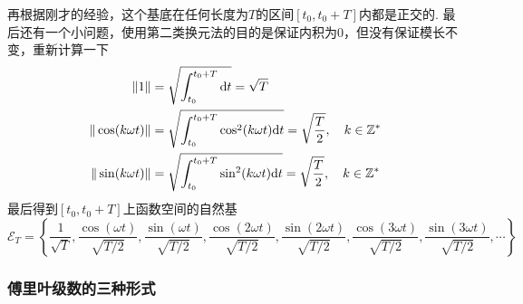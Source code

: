\documentclass[main.tex]{subfiles}
\begin{document}
再根据刚才的经验，这个基底在任何长度为\(T\)的区间\([t_0,t_0+T]\)内都是正交的. 最后还有一个小问题，使用第二类换元法的目的是保证内积为\(0\)，但没有保证模长不变，重新计算一下
\begin{align*}
    \|1\| &= \sqrt{\int_{t_0}^{t_0+T}{\rm d}t} = \sqrt{T} \\
    \|\cos(k\omega t)\| &= \sqrt{\int_{t_0}^{t_0+T} \cos^2(k\omega t) {\rm d}t} = \sqrt{\frac{T}{2}},\quad k \in \mathbb{Z}^* \\
    \|\sin(k\omega t)\| &= \sqrt{\int_{t_0}^{t_0+T} \sin^2(k\omega t) {\rm d}t} = \sqrt{\frac{T}{2}},\quad k \in \mathbb{Z}^*
\end{align*}
最后得到\([t_0,t_0+T]\)上函数空间的自然基
\[ \mathcal{E}_{T} = \left\{ \frac{1}{\sqrt{T}}, \frac{\cos(\omega t)}{\sqrt{T/2}}, \frac{\sin(\omega t)}{\sqrt{T/2}}, \frac{\cos(2\omega t)}{\sqrt{T/2}}, \frac{\sin(2\omega t)}{\sqrt{T/2}}, \frac{\cos(3\omega t)}{\sqrt{T/2}}, \frac{\sin(3\omega t)}{\sqrt{T/2}}, \cdots \right\} \]


\subsubsection{傅里叶级数的三种形式}
\end{document}
